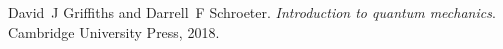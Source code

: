 
\begin{DoxyDescription}
\item[\label{citelist_CITEREF_griffiths2018introduction}%
\Hypertarget{citelist_CITEREF_griffiths2018introduction}%
\mbox{[}1\mbox{]}]David~J Griffiths and Darrell~F Schroeter. {\itshape Introduction to quantum mechanics}. Cambridge University Press, 2018.


\end{DoxyDescription}